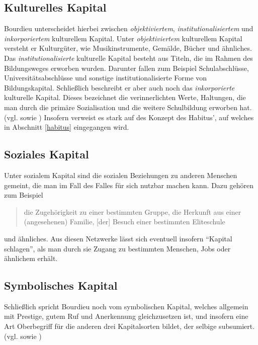 \documentclass[a4paper, german, oneside]{scrbook}
\begin{document}
\subsection{Kulturelles Kapital}
Bourdieu unterscheidet hierbei zwischen \emph{objektiviertem}, \emph{institutionalisiertem} und \emph{inkorporiertem} kulturellem Kapital. Unter \emph{objektiviertem} kulturellem Kapital versteht er Kulturgüter, wie Musikinstrumente, Gemälde, Bücher und ähnliches. Das \emph{institutionalisierte} kulturelle Kapital besteht aus Titeln, die im Rahmen des Bildungsweges erworben wurden. Darunter fallen zum Beispiel Schulabschlüsse, Universitätsabschlüsse und sonstige institutionalisierte Forme von Bildungskapital. Schließlich beschreibt er aber auch noch das \emph{inkorporierte} kulturelle Kapital. Dieses bezeichnet die verinnerlichten Werte, Haltungen, die man durch die primäre Sozialisation und die weitere Schulbildung erworben hat. (vgl. \cite[539f.]{joas_sozialtheorie:_2004} sowie \cite[86f.]{luthje_medium_2008}) Insofern verweist es stark auf des Konzept des Habitus', auf welches in Abschnitt \ref{habitus} eingegangen wird.

\subsection{Soziales Kapital}
Unter sozialem Kapital sind die sozialen Beziehungen zu anderen Menschen gemeint, die man im Fall des Falles für sich nutzbar machen kann. Dazu gehören zum Beispiel \blockquote[{\cite[540]{joas_sozialtheorie:_2004}}]{die Zugehörigkeit zu einer bestimmten Gruppe, die Herkunft aus einer (angesehenen) Familie, [der] Besuch einer bestimmten Eliteschule} und ähnliches. Aus diesen Netzwerke lässt sich eventuell insofern \enquote{Kapital schlagen}, als man durch sie Zugang zu bestimmten Menschen, Jobs oder ähnlichem erhält.

\subsection{Symbolisches Kapital}
Schließlich spricht Bourdieu noch vom symbolischen Kapital, welches allgemein mit Prestige, gutem Ruf und Anerkennung gleichzusetzen ist, und insofern eine Art Oberbegriff für die anderen drei Kapitalsorten bildet, der selbige subsumiert. (vgl. \cite[540]{joas_sozialtheorie:_2004} sowie \cite[87]{luthje_medium_2008})
\end{document}
